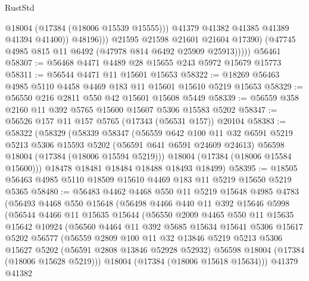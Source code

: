 \begin{lexlean}{RustStd}
\begin{coremodule}
                        @18004
                        (@17384 (@18006 @15539 @15555)))
                      @41379
                      @41382
                      @41385
                      @41389
                      @41394
                      @41400))
                  @48196)))
            @21595
            @21598
            @21601
            @21604
            @17390)
          (@47745 @4985 @815 @11 @6492 (@47978 @814 @6492 @25909 @25913)))))
    @56461
@58307 := @56468 @4471 @4489 @28 @15655 @243 @5972 @15679 @15773
@58311 := @56544 @4471 @11 @15601 @15653
@58322 := @18269 @56463 @4985 @5110 @4458 @4469 @183 @11 @15601 @15610 @5219 @15653
@58329 := @56550 @216 @2811 @550 @42 @15601 @15608 @5449
@58339 := @56559 @358 @2160 @11 @392 @5765 @15600 @15607 @5306 @15583 @5202
@58347 := @56526 @157 @11 @157 @5765 (@17343 (@56531 @157)) @20104
@58383 := @58322
    (@58329
      (@58339
        @58347
        (@56559
          @642
          @100
          @11
          @32
          @6591
          @5219
          @5213
          @5306
          @15593
          @5202
          (@56591 @641 @6591 @24609 @24613)
          @56598
          @18004
          (@17384 (@18006 @15594 @5219)))
        @18004
        (@17384 (@18006 @15584 @15600)))
      @18478
      @18481
      @18484
      @18488
      @18493
      @18499)
@58395 := @18505 @56463 @4985 @5110 @18509 @15610 @4469 @183 @11 @5219 @15650 @5219 @5365
@58480 := @56483
    @4462
    @4468
    @550
    @11
    @5219
    @15648
    @4985
    @4783
    (@56493
      @4468
      @550
      @15648
      (@56498
        @4466
        @440
        @11
        @392
        @15646
        @5998
        (@56544
          @4466
          @11
          @15635
          @15644
          (@56550
            @2009
            @4465
            @550
            @11
            @15635
            @15642
            @10924
            (@56560
              @4464
              @11
              @392
              @5685
              @15634
              @15641
              @5306
              @15617
              @5202
              @56577
              (@56559
                @2809
                @100
                @11
                @32
                @13846
                @5219
                @5213
                @5306
                @15627
                @5202
                (@56591 @2808 @13846 @52928 @52932)
                @56598
                @18004
                (@17384 (@18006 @15628 @5219)))
              @18004
              (@17384 (@18006 @15618 @15634)))
            @41379
            @41382

\end{coremodule}
\end{lexlean}
